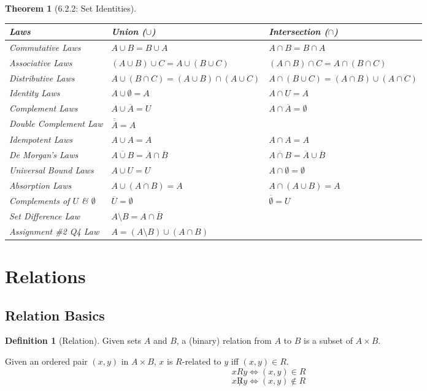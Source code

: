 \documentclass{article}
\theoremstyle{plain}
\newtheorem{theorem}{Theorem}[section]
\theoremstyle{definition}
\newtheorem*{definition}{Definition}
\theoremstyle{remark}
\begin{document}
\newpage
\begin{theorem}[6.2.2: Set Identities]
\hfill
\begin{table}[h]
    \centering
    \begin{tabular}{lll}
        \toprule
        \textbf{Laws} & \textbf{Union ($\cup$)} & \textbf{Intersection ($\cap$)} \\
        \midrule
        Commutative Laws & $A \cup B = B \cup A$ & $A \cap B = B \cap A$ \\
        Associative Laws & $(A \cup B) \cup C = A \cup (B \cup C)$ & $(A \cap B) \cap C = A \cap (B \cap C)$ \\
        Distributive Laws & $A \cup (B \cap C) = (A \cup B) \cap (A \cup C)$ & $A \cap (B \cup C) = (A \cap B) \cup (A \cap C)$ \\
        Identity Laws & $A \cup \emptyset = A$ & $A \cap U = A$ \\
        Complement Laws & $A \cup \overline{A} = U$ & $A \cap \overline{A} = \emptyset$ \\
        Double Complement Law & $\overline{\overline{A}} = A$ & \\
        Idempotent Laws & $A \cup A = A$ & $A \cap A = A$ \\
        De Morgan's Laws & $\overline{A \cup B} = \overline{A} \cap \overline{B}$ & $\overline{A \cap B} = \overline{A} \cup \overline{B}$ \\
        Universal Bound Laws & $A \cup U = U$ & $A \cap \emptyset = \emptyset$ \\
        Absorption Laws & $A \cup (A \cap B) = A$ & $A \cap (A \cup B) = A$ \\
        Complements of $U$ \& $\emptyset$ & $\overline{U} = \emptyset$ & $\overline{\emptyset} = U$ \\
        \midrule
        Set Difference Law & \multicolumn{2}{l}{$A \setminus B = A \cap \overline{B}$} \\
        Assignment \#2 Q4 Law & \multicolumn{2}{l}{$A = (A \setminus B) \cup (A \cap B)$} \\
        \bottomrule
    \end{tabular}
    \label{tab:set_identities}
\end{table}
\end{theorem}

\section{Relations}

\subsection{Relation Basics}
\begin{definition}[Relation]
    Given sets $A$ and $B$, a (binary) relation from $A$ to $B$ is a subset of $A \times B$.
    
    Given an ordered pair $(x,y)$ in $A \times B$, $x$ is $R$-related to $y$ iff $(x,y) \in R$.
    \[ xRy \Leftrightarrow (x,y) \in R \]
    \[ x \not R y \Leftrightarrow (x,y) \notin R \]
\end{definition}
\end{document}
